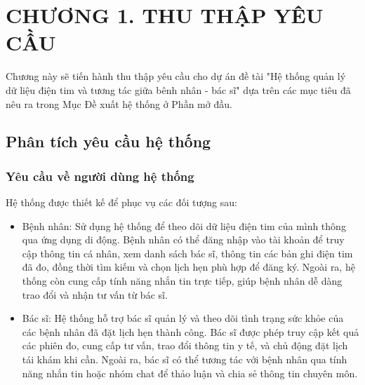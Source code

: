 
\section*{CHƯƠNG 1. THU THẬP YÊU CẦU}
\setcounter{section}{1}
\setcounter{subsection}{0} %
\setcounter{table}{0} %
\setcounter{figure}{0} %
Chương này sẽ tiến hành thu thập yêu cầu cho dự án đề tài "Hệ thống quản lý dữ liệu điện tim và tương tác giữa bênh nhân - bác sĩ"
dựa trên các mục tiêu đã nêu ra trong Mục Đề xuất hệ thống ở Phần mở đầu.

\subsection{Phân tích yêu cầu hệ thống}
\subsubsection{Yêu cầu về người dùng hệ thống}
Hệ thống được thiết kế để phục vụ các đối tượng sau:
\begin{adjustwidth}{1.5em}{}
\begin{itemize}
    \item Bệnh nhân: Sử dụng hệ thống để theo dõi dữ liệu điện tim của mình thông qua ứng dụng di động. 
    Bệnh nhân có thể đăng nhập vào tài khoản để truy cập thông tin cá nhân, xem danh sách bác sĩ, thông tin các bản ghi điện tim đã đo, đồng thời tìm kiếm và chọn lịch hẹn phù hợp để đăng ký.
    Ngoài ra, hệ thống còn cung cấp tính năng nhắn tin trực tiếp, giúp bệnh nhân dễ dàng trao đổi và nhận tư vấn từ bác sĩ.
    
    \item Bác sĩ: Hệ thống hỗ trợ bác sĩ quản lý và theo dõi tình trạng sức khỏe của các bệnh nhân đã đặt lịch hẹn thành công.
    Bác sĩ được phép truy cập kết quả các phiên đo, cung cấp tư vấn, trao đổi thông tin y tế, và chủ động đặt lịch tái khám khi cần.
    Ngoài ra, bác sĩ có thể tương tác với bệnh nhân qua tính năng nhắn tin hoặc nhóm chat để thảo luận và chia sẻ thông tin chuyên môn.
    

\end{itemize}
\end{adjustwidth}

